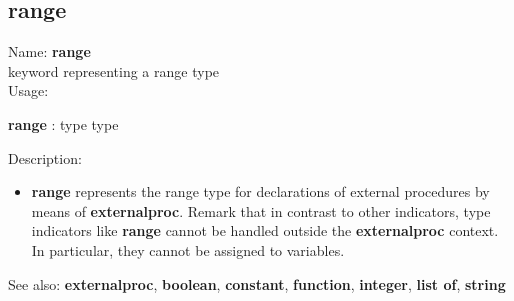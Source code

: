 \subsection{ range }
\noindent Name: \textbf{range}\\
keyword representing a \textsf{range} type \\

\noindent Usage: 
\begin{center}
\textbf{range} : \textsf{type type}\\
\end{center}
\noindent Description: \begin{itemize}

\item \textbf{range} represents the \textsf{range} type for declarations
   of external procedures by means of \textbf{externalproc}.
   Remark that in contrast to other indicators, type indicators like
   \textbf{range} cannot be handled outside the \textbf{externalproc} context.  In
   particular, they cannot be assigned to variables.
\end{itemize}
See also: \textbf{externalproc}, \textbf{boolean}, \textbf{constant}, \textbf{function}, \textbf{integer}, \textbf{list of}, \textbf{string}

